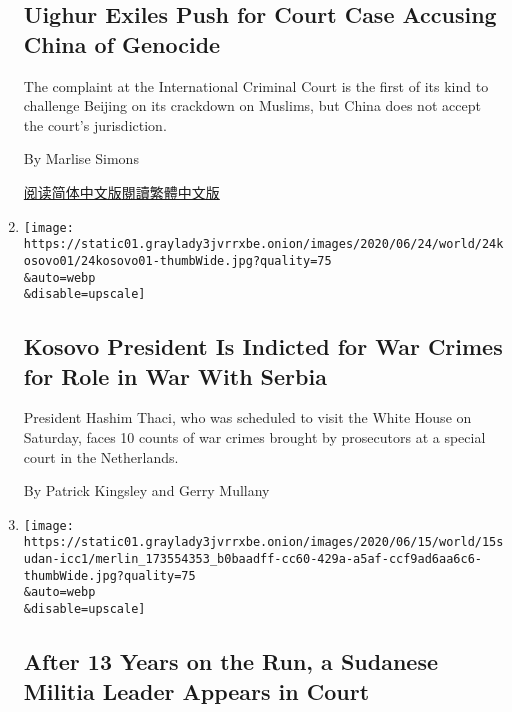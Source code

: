 \begin{enumerate}
  \hypertarget{uighur-exiles-push-for-court-case-accusing-china-of-genocide}{%
  \subsection{Uighur Exiles Push for Court Case Accusing China of
  Genocide}\label{uighur-exiles-push-for-court-case-accusing-china-of-genocide}}

  The complaint at the International Criminal Court is the first of its
  kind to challenge Beijing on its crackdown on Muslims, but China does
  not accept the court's jurisdiction.

  By Marlise Simons

  \href{https://cn.nytimes3xbfgragh.onion/world/20200707/china-xinjiang-uighur-court/}{阅读简体中文版}\href{https://cn.nytimes3xbfgragh.onion/world/20200707/china-xinjiang-uighur-court/zh-hant/}{閱讀繁體中文版}
\item
  \href{/2020/06/24/world/europe/hashim-thaci-kosovo-war-crimes.html}{}

  \texttt{[image: https://static01.graylady3jvrrxbe.onion/images/2020/06/24/world/24kosovo01/24kosovo01-thumbWide.jpg?quality=75\\\&auto=webp\\\&disable=upscale]}

  \hypertarget{kosovo-president-is-indicted-for-war-crimes-for-role-in-war-with-serbia}{%
  \subsection{Kosovo President Is Indicted for War Crimes for Role in
  War With
  Serbia}\label{kosovo-president-is-indicted-for-war-crimes-for-role-in-war-with-serbia}}

  President Hashim Thaci, who was scheduled to visit the White House on
  Saturday, faces 10 counts of war crimes brought by prosecutors at a
  special court in the Netherlands.

  By Patrick Kingsley and Gerry Mullany
\item
  \href{/2020/06/15/world/africa/sudan-darfur-ali-kushayb-icc.html}{}

  \texttt{[image: https://static01.graylady3jvrrxbe.onion/images/2020/06/15/world/15sudan-icc1/merlin\_173554353\_b0baadff-cc60-429a-a5af-ccf9ad6aa6c6-thumbWide.jpg?quality=75\\\&auto=webp\\\&disable=upscale]}

  \hypertarget{after-13-years-on-the-run-a-sudanese-militia-leader-appears-in-court}{%
  \subsection{After 13 Years on the Run, a Sudanese Militia Leader
  Appears in
  Court}\label{after-13-years-on-the-run-a-sudanese-militia-leader-appears-in-court}}


\end{enumerate}
